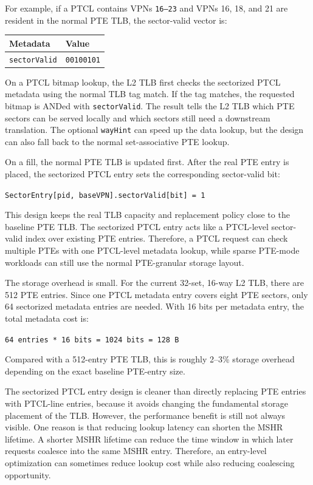 \documentclass[11pt]{article}
\begin{document}
For example, if a PTCL contains VPNs \texttt{16--23} and VPNs 16, 18, and 21 are
resident in the normal PTE TLB, the sector-valid vector is:

\begin{center}
\begin{tabular}{ll}
\toprule
Metadata & Value \\
\midrule
\texttt{sectorValid} & \texttt{00100101} \\
\bottomrule
\end{tabular}
\end{center}

On a PTCL bitmap lookup, the L2 TLB first checks the sectorized PTCL metadata using
the normal TLB tag match. If the tag matches, the requested bitmap is ANDed with
\texttt{sectorValid}. The result tells the L2 TLB which PTE sectors can be
served locally and which sectors still need a downstream translation. The
optional \texttt{wayHint} can speed up the data lookup, but the design can also
fall back to the normal set-associative PTE lookup.

On a fill, the normal PTE TLB is updated first. After the real PTE entry is
placed, the sectorized PTCL entry sets the corresponding sector-valid bit:

\begin{center}
\texttt{SectorEntry[pid, baseVPN].sectorValid[bit] = 1}
\end{center}

This design keeps the real TLB capacity and replacement policy close to the
baseline PTE TLB. The sectorized PTCL entry acts like a PTCL-level sector-valid
index over existing PTE entries. Therefore, a PTCL request can check multiple
PTEs with one PTCL-level metadata lookup, while sparse PTE-mode workloads can
still use the normal PTE-granular storage layout.

The storage overhead is small. For the current 32-set, 16-way L2 TLB, there are
512 PTE entries. Since one PTCL metadata entry covers eight PTE sectors, only
64 sectorized metadata entries are needed. With 16 bits per metadata entry, the
total metadata cost is:

\begin{center}
\texttt{64 entries * 16 bits = 1024 bits = 128 B}
\end{center}

Compared with a 512-entry PTE TLB, this is roughly 2--3\% storage overhead
depending on the exact baseline PTE-entry size.

The sectorized PTCL entry design is cleaner than directly replacing PTE entries with PTCL-line
entries, because it avoids changing the fundamental storage placement of the TLB.
However, the performance benefit is still not always visible. One reason is
that reducing lookup latency can shorten the MSHR lifetime. A shorter MSHR
lifetime can reduce the time window in which later requests coalesce into the
same MSHR entry. Therefore, an entry-level optimization can sometimes reduce
lookup cost while also reducing coalescing opportunity.
\end{document}
